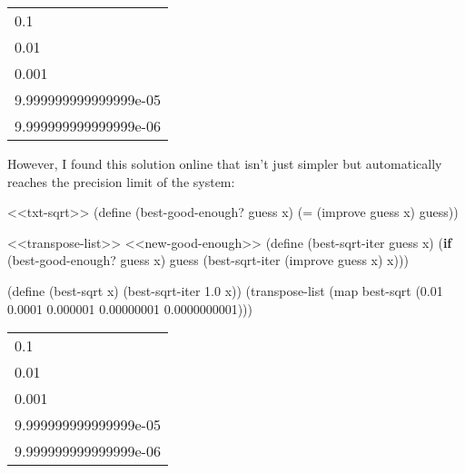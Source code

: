 \documentclass[
]{article}
\newenvironment{Shaded}{}{}
\newcommand{\ExtensionTok}[1]{#1}
\newcommand{\FloatTok}[1]{\textcolor[rgb]{0.25,0.63,0.44}{#1}}
\newcommand{\FunctionTok}[1]{\textcolor[rgb]{0.02,0.16,0.49}{#1}}
\newcommand{\KeywordTok}[1]{\textcolor[rgb]{0.00,0.44,0.13}{\textbf{#1}}}
\newcommand{\NormalTok}[1]{#1}
\newcommand{\OperatorTok}[1]{\textcolor[rgb]{0.40,0.40,0.40}{#1}}
\begin{document}
\begin{longtable}[]{@{}l@{}}
\toprule
\endhead
0.1 \\
0.01 \\
0.001 \\
9.999999999999999e-05 \\
9.999999999999999e-06 \\
\bottomrule
\end{longtable}

However, I found this solution online that isn't just simpler but
automatically reaches the precision limit of the system:

\hypertarget{new-good-enough}{%
\label{new-good-enough}}%
\begin{Shaded}
\begin{Highlighting}[]
\NormalTok{\textless{}\textless{}txt{-}sqrt\textgreater{}\textgreater{}}
\NormalTok{(}\ExtensionTok{define}\FunctionTok{ }\NormalTok{(best{-}good{-}enough? guess x)}
\NormalTok{   (}\OperatorTok{=}\NormalTok{ (improve guess x) guess))}
\end{Highlighting}
\end{Shaded}

\hypertarget{EX1-7-t3}{%
\label{EX1-7-t3}}%
\begin{Shaded}
\begin{Highlighting}[]
\NormalTok{\textless{}\textless{}transpose{-}list\textgreater{}\textgreater{}}
\NormalTok{\textless{}\textless{}new{-}good{-}enough\textgreater{}\textgreater{}}
\NormalTok{(}\ExtensionTok{define}\FunctionTok{ }\NormalTok{(best{-}sqrt{-}iter guess x)}
\NormalTok{  (}\KeywordTok{if}\NormalTok{ (best{-}good{-}enough? guess x)}
\NormalTok{      guess}
\NormalTok{      (best{-}sqrt{-}iter (improve guess x) x)))}

\NormalTok{(}\ExtensionTok{define}\FunctionTok{ }\NormalTok{(best{-}sqrt x)}
\NormalTok{  (best{-}sqrt{-}iter }\FloatTok{1.0}\NormalTok{ x))}
\NormalTok{(transpose{-}list (map best{-}sqrt \textquotesingle{}(}\FloatTok{0.01} \FloatTok{0.0001} \FloatTok{0.000001} \FloatTok{0.00000001} \FloatTok{0.0000000001}\NormalTok{)))}
\end{Highlighting}
\end{Shaded}

\begin{longtable}[]{@{}l@{}}
\toprule
\endhead
0.1 \\
0.01 \\
0.001 \\
9.999999999999999e-05 \\
9.999999999999999e-06 \\
\bottomrule
\end{longtable}
\end{document}
